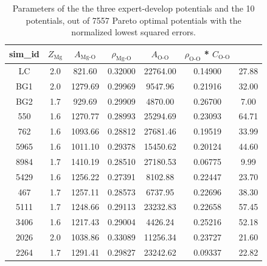 \begin{table}[ht]
	\caption{Parameters of the the three expert-develop potentials and the 10 potentials, out of 7557 Pareto optimal potentials with the normalized lowest squared errors.}
	\label{tbl:MgO_best_param}
	\centering
	\begin{tabular}{ccccccc}
		\hline
		{sim\_id} & $Z_{\text{Mg}}$ & $A_{\text{Mg-O}}$ & $\rho_{\text{Mg-O}}$ & $A_{\text{O-O}}$ & $\rho_{\text{O-O}}$ * $C_{\text{O-O}}$ \\
    \hline
		LC  & 2.0 & 821.60   & 0.32000 & 22764.00 & 0.14900 & 27.88 \\
		BG1 &	2.0 &	1279.69  &	0.29969 &	9547.96 &	0.21916 &	32.00 \\
		BG2 &	1.7	& 929.69   & 0.29909 & 4870.00 & 0.26700 & 7.00 \\
		550 &	1.6	& 1270.77	 & 0.28993 &	25294.69 & 0.23093 & 64.71 \\
		762  &	1.6	& 1093.66	 & 0.28812 &	27681.46 & 0.19519 & 33.99 \\
		5965 &	1.6	& 1011.10	 & 0.29378 &	15450.62 & 0.20124 & 44.60 \\
		8984 &	1.7	& 1410.19	 & 0.28510 &	27180.53 & 0.06775 & 9.99 \\
		5429 &	1.6 &	1256.22	 & 0.27391 & 8102.88 & 0.22447 & 23.70 \\
		467  &	1.7	& 1257.11	 & 0.28573 & 6737.95 & 0.22696 & 38.30 \\
		5111 &	1.7	& 1248.66	 & 0.29113 & 23232.83 &	0.22658 & 57.45 \\
		3406 &	1.6	& 1217.43	 & 0.29004 & 4426.24 & 0.25216 & 52.18 \\
		2026 &	2.0	& 1038.86	 & 0.33089 & 11256.34 & 0.23727 &	21.60 \\
		2264 &	1.7	& 1291.41	 & 0.29827 & 23242.62 & 0.09337 &22.82 \\
		\hline
	\end{tabular}
\end{table}

